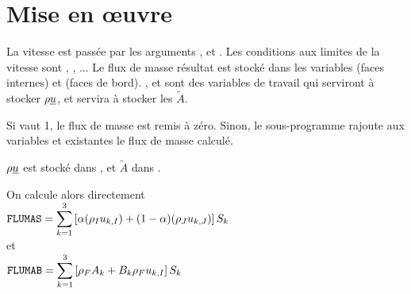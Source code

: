 %
%
%
%
%
%
%
%

\section{Mise en \oe uvre}

La vitesse est pass\'ee par les arguments ,  et . Les
conditions aux limites de la vitesse sont , , ... Le
flux de masse r\'esultat est stock\'e dans les variables  (faces
internes) et  (faces de bord). ,  et 
sont des variables de travail qui serviront \`a stocker $\rho\underline{u}$, et
 servira \`a stocker les $\tilde{A}$.

Si  vaut 1, le flux de masse est remis \`a z\'ero. Sinon, le
sous-programme rajoute aux variables  et  existantes le
flux de masse calcul\'e.


$\rho\underline{u}$ est stock\'e dans , et $\tilde{A}$ dans .


On calcule alors directement\\
$\displaystyle \text{\texttt{FLUMAS}}=\sum\limits_{k=1}^{3}\left[
\alpha(\rho_I u_{k,I})+(1-\alpha)(\rho_J u_{k,J})\right]S_k$\\
et\\
$\displaystyle \text{\texttt{FLUMAB}}=\sum\limits_{k=1}^{3}\left[
\rho_F A_k + B_k\rho_Fu_{k,I}\right]S_k$



